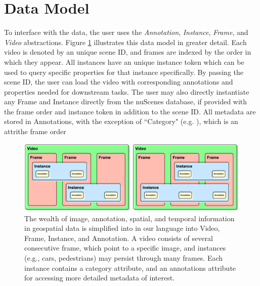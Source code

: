 
\section{Data Model}

To interface with the data, the user uses the \textit{Annotation}, \textit{Instance}, \textit{Frame}, and \textit{Video} abstractions.
Figure \ref{fig:abstraction} illustrates this data model in greater detail.
Each video is denoted by an unique scene ID, and frames are indexed by the order in which they appear.
All instances have an unique instance token which can be used to query specific properties for that instance specifically.
By passing the scene ID, the user can load the video with corresponding annotations and properties needed for downstream tasks.
The user may also directly instantiate any Frame and Instance directly from the nuScenes database, if provided with the frame order and instance token in addition to the scene ID.
All metadata are stored in Annotations, with the exception of ``Category" (e.g. ), which is an attrithe frame order

\newcommand{\dataModelCaption}{
The wealth of image, annotation, spatial, and temporal information in geospatial data is simplified into in our language into Video, Frame, Instance, and Annotation.
A video consists of several consecutive frame, which point to a specific image, and instances (e.g., cars, pedestrians) may persist through many frames.
Each instance contains a category attribute, and an annotations attribute for accessing more detailed metadata of interest.
}

\begin{figure}[ht]
    \centering
    \includegraphics[width=\textwidth]{figures/data-abstraction.png}
    \caption{\dataModelCaption}
    \label{fig:abstraction}
\end{figure}

